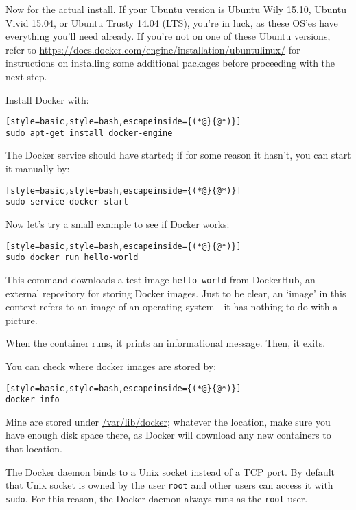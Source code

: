 Now for the actual install. If your Ubuntu version is Ubuntu Wily 15.10, Ubuntu Vivid 15.04, or Ubuntu Trusty 14.04 (LTS), you're in luck, as these OS'es have everything you'll need already. If you're not on one of these Ubuntu versions, refer to \url{https://docs.docker.com/engine/installation/ubuntulinux/} for instructions on installing some additional packages before proceeding with the next step.

Install Docker with:
\begin{lstlisting}[style=basic,style=bash,escapeinside={(*@}{@*)}]
sudo apt-get install docker-engine
\end{lstlisting}

The Docker service should have started; if for some reason it hasn't, you can start it manually by:
\begin{lstlisting}[style=basic,style=bash,escapeinside={(*@}{@*)}]
sudo service docker start
\end{lstlisting}

Now let's try a small example to see if Docker works:
\begin{lstlisting}[style=basic,style=bash,escapeinside={(*@}{@*)}]
sudo docker run hello-world
\end{lstlisting}

This command downloads a test image \texttt{hello-world} from DockerHub, an external repository for storing Docker images. Just to be clear, an `image' in this context refers to an image of an operating system---it has nothing to do with a picture.

When the container runs, it prints an informational message. Then, it exits.

You can check where docker images are stored by:
\begin{lstlisting}[style=basic,style=bash,escapeinside={(*@}{@*)}]
docker info
\end{lstlisting}
Mine are stored under \url{/var/lib/docker}; whatever the location, make sure you have enough disk space there, as Docker will download any new containers to that location.

The Docker daemon binds to a Unix socket instead of a TCP port. By default that Unix socket is owned by the user \texttt{root} and other users can access it with \texttt{sudo}. For this reason, the Docker daemon always runs as the \texttt{root} user.

